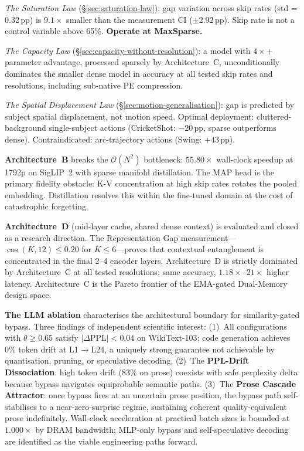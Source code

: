 \documentclass{article}
\begin{document}
\textit{The Saturation Law} (§\ref{sec:saturation-law}): gap variation
across skip rates (std = 0.32\,pp) is $9.1\times$ smaller than the
measurement CI ($\pm 2.92$\,pp). Skip rate is not a control variable above
65\%. \textbf{Operate at MaxSparse.}

\textit{The Capacity Law} (§\ref{sec:capacity-without-resolution}): a
model with $4\times$+ parameter advantage, processed sparsely by
Architecture~C, unconditionally dominates the smaller dense model in
accuracy at all tested skip rates and resolutions, including sub-native
PE compression.

\textit{The Spatial Displacement Law} (§\ref{sec:motion-generalisation}):
gap is predicted by subject spatial displacement, not motion speed. Optimal
deployment: cluttered-background single-subject actions (CricketShot:
$-20$\,pp, sparse outperforms dense). Contraindicated: arc-trajectory
actions (Swing: $+43$\,pp).

\textbf{Architecture~B} breaks the $\mathcal{O}(N^2)$ bottleneck:
$55.80\times$ wall-clock speedup at 1792p on SigLIP~2 with sparse manifold
distillation. The MAP head is the primary fidelity obstacle: K-V
concentration at high skip rates rotates the pooled embedding. Distillation
resolves this within the fine-tuned domain at the cost of catastrophic
forgetting.

\textbf{Architecture~D} (mid-layer cache, shared dense context) is
evaluated and closed as a research direction. The Representation Gap
measurement---$\cos(K, 12) \leq 0.20$ for $K \leq 6$---proves that
contextual entanglement is concentrated in the final 2--4 encoder layers.
Architecture~D is strictly dominated by Architecture~C at all tested
resolutions: same accuracy, $1.18\times$--$21\times$ higher latency.
Architecture~C is the Pareto frontier of the EMA-gated Dual-Memory design
space.

\textbf{The LLM ablation} characterises the architectural boundary for
similarity-gated bypass. Three findings of independent scientific interest:
(1)~All configurations with $\theta \geq 0.65$ satisfy
$|\Delta\mathrm{PPL}| < 0.04$ on WikiText-103; code generation achieves
0\% token drift at L1$\to$L24, a uniquely strong guarantee not achievable
by quantisation, pruning, or speculative decoding. (2)~The
\textbf{PPL-Drift Dissociation}: high token drift (83\% on prose) coexists
with safe perplexity delta because bypass navigates equiprobable semantic
paths. (3)~The \textbf{Prose Cascade Attractor}: once bypass fires at an
uncertain prose position, the bypass path self-stabilises to a
near-zero-surprise regime, sustaining coherent quality-equivalent prose
indefinitely. Wall-clock acceleration at practical batch sizes is bounded
at $1.000\times$ by DRAM bandwidth; MLP-only bypass and self-speculative
decoding are identified as the viable engineering paths forward.
\end{document}
